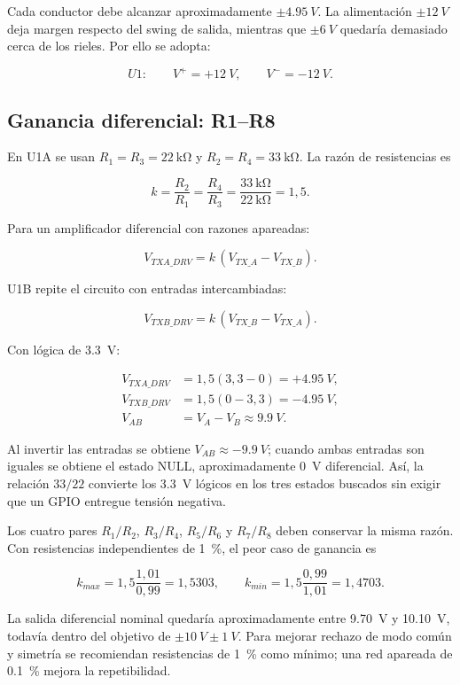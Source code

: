 \documentclass[11pt,a4paper]{article}
\begin{document}
Cada conductor debe alcanzar aproximadamente $\pm\SI{4.95}{V}$. La alimentación
$\pm\SI{12}{V}$ deja margen respecto del swing de salida, mientras que
$\pm\SI{6}{V}$ quedaría demasiado cerca de los rieles. Por ello se adopta:

\[
  U1:\qquad V^+=+\SI{12}{V},\qquad V^-=-\SI{12}{V}.
\]

\subsection{Ganancia diferencial: R1--R8}

En U1A se usan $R_1=R_3=\SI{22}{\kilo\ohm}$ y
$R_2=R_4=\SI{33}{\kilo\ohm}$. La razón de resistencias es

\[
  k=\frac{R_2}{R_1}=\frac{R_4}{R_3}
   =\frac{\SI{33}{\kilo\ohm}}{\SI{22}{\kilo\ohm}}=1{,}5.
\]

Para un amplificador diferencial con razones apareadas:

\[
  V_{TXA\_DRV}=k\,(V_{TX\_A}-V_{TX\_B}).
\]

U1B repite el circuito con entradas intercambiadas:

\[
  V_{TXB\_DRV}=k\,(V_{TX\_B}-V_{TX\_A}).
\]

Con lógica de \SI{3.3}{V}:

\begin{align*}
  V_{TXA\_DRV} &= 1{,}5(3{,}3-0)=+\SI{4.95}{V},\\
  V_{TXB\_DRV} &= 1{,}5(0-3{,}3)=-\SI{4.95}{V},\\
  V_{AB} &= V_A-V_B\approx \SI{9.9}{V}.
\end{align*}

Al invertir las entradas se obtiene $V_{AB}\approx-\SI{9.9}{V}$; cuando ambas
entradas son iguales se obtiene el estado NULL, aproximadamente \SI{0}{V}
diferencial. Así, la relación $33/22$ convierte los \SI{3.3}{V} lógicos en los
tres estados buscados sin exigir que un GPIO entregue tensión negativa.

Los cuatro pares $R_1/R_2$, $R_3/R_4$, $R_5/R_6$ y $R_7/R_8$ deben conservar
la misma razón. Con resistencias independientes de \SI{1}{\percent}, el peor
caso de ganancia es

\[
  k_{max}=1{,}5\frac{1{,}01}{0{,}99}=1{,}5303,\qquad
  k_{min}=1{,}5\frac{0{,}99}{1{,}01}=1{,}4703.
\]

La salida diferencial nominal quedaría aproximadamente entre
\SI{9.70}{V} y \SI{10.10}{V}, todavía dentro del objetivo de
$\pm\SI{10}{V}\pm\SI{1}{V}$. Para mejorar rechazo de modo común y simetría se
recomiendan resistencias de \SI{1}{\percent} como mínimo; una red apareada de
\SI{0.1}{\percent} mejora la repetibilidad.
\end{document}

